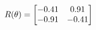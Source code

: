 \documentclass[preview]{standalone}
\begin{document}
\begin{align*}
\special{dvisvgm:raw <g id='unique000'>}R(\theta) = \begin{bmatrix}-0.41 & 0.91\\-0.91 & -0.41\end{bmatrix}\special{dvisvgm:raw </g>}
\end{align*}
\end{document}
